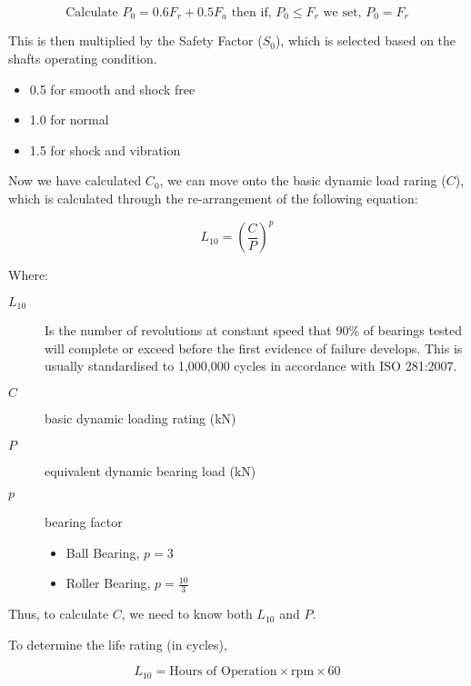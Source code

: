 \begin{equation}
  \text{Calculate } P_0 = 0.6F_r+0.5F_a \text{ then if, } P_0 \le F_r \text{ we set, }P_0 = F_r
\end{equation}

This is then multiplied by the Safety Factor (\(S_0\)), which is selected based on the shafts operating condition.

\begin{itemize}
  \item 0.5 for smooth and shock free
  \item 1.0 for normal
  \item 1.5 for shock and vibration
\end{itemize}

Now  we have calculated \(C_0\), we can move onto the basic dynamic load raring (\(C\)), which is calculated through the re-arrangement of the following equation:

\begin{equation}
  L_{10} = \left(\frac{C}{P}\right)^p
  \label{equ-bearing-life}
\end{equation}

\noindent{} Where:

\begin{description}
  \item[\(L_{10}\)] Is the number of revolutions at constant speed that 90\% of bearings tested will complete or exceed before the first evidence of failure develops. This is usually standardised to 1,000,000 cycles in accordance with ISO 281:2007.
  \item[\(C\)] basic dynamic loading rating (\si{\kilo\newton})
  \item[\(P\)] equivalent dynamic bearing load (\si{\kilo\newton})
  \item[\(p\)] bearing factor
  \begin{itemize}
    \item Ball Bearing, \(p=3\)
    \item Roller Bearing, \(p=\frac{10}{3}\)
  \end{itemize}
\end{description}

Thus, to calculate \(C\), we need to know both \(L_{10}\) and \(P\).

To determine the life rating (in cycles),

\begin{equation}
  L_{10} = \text{Hours of Operation} \times \text{rpm} \times 60
\end{equation}

